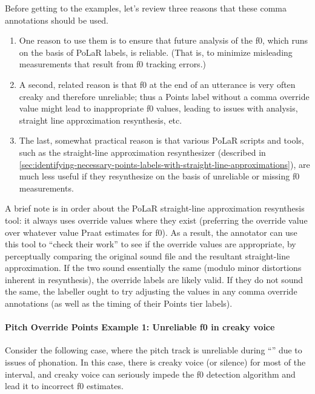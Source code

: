 Before getting to the examples, let’s review three reasons that these comma annotations should be used.
\begin{enumerate}
	\item One reason to use them is to ensure that future analysis of the f0, which runs on the basis of PoLaR labels, is reliable. (That is, to minimize misleading measurements that result from f0 tracking errors.)
	\item A second, related reason is that f0 at the end of an utterance is very often creaky and therefore unreliable; thus a Points label without a comma override value might lead to inappropriate f0 values, leading to issues with analysis, straight line approximation resynthesis, etc.
	\item The last, somewhat practical  reason is that various PoLaR scripts and tools, such as the straight-line approximation resynthesizer (described in \ref{sec:identifying-necessary-points-labels-with-straight-line-approximations}), are much less useful if they resynthesize on the basis of unreliable or missing f0 measurements.
\end{enumerate}

A brief note is in order about the PoLaR straight-line approximation resynthesis tool: it always uses override values where they exist (preferring the override value over whatever value Praat estimates for f0). As a result, the annotator can use this tool to “check their work” to see if the override values are appropriate, by perceptually comparing the original sound file and the resultant straight-line approximation. If the two sound essentially the same (modulo minor distortions inherent in resynthesis), the override labels are likely valid. If they do not sound the same, the labeller ought to try adjusting the values in any comma override annotations (as well as the timing of their Points tier labels).

\paragraph{Pitch Override Points Example 1: Unreliable f0 in creaky voice\label{pitch-override-points-example-1}}

Consider the following case, where the pitch track is unreliable during “” due to issues of phonation. In this case, there is creaky voice (or silence) for most of the interval, and creaky voice can seriously impede the f0 detection algorithm and lead it to incorrect f0 estimates.



